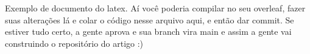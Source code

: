 \documentclass[a4paper,12pt]{article}
\begin{document}
Exemplo de documento do latex. 
Aí você poderia compilar no seu overleaf, fazer suas alterações lá e colar o código nesse arquivo aqui, e então dar commit. 
Se estiver tudo certo, a gente aprova e sua branch vira main e assim a gente vai construindo o repositório do artigo :)
\end{document}

